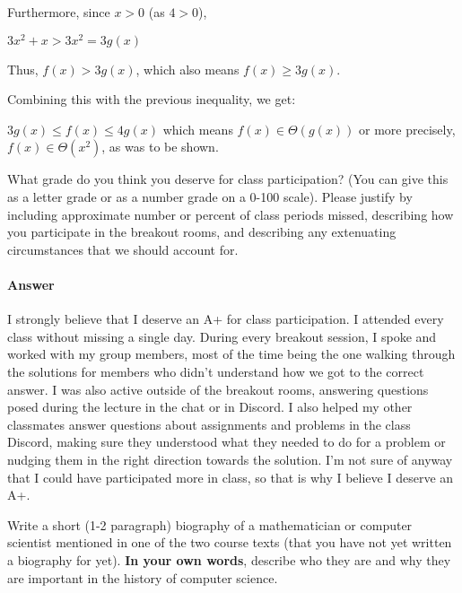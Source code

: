 \documentclass{article}
\begin{document}
Furthermore, since $x > 0$ (as $4 > 0$),

$3x^2+x > 3x^2 = 3g(x)$

Thus, $f(x) > 3g(x)$, which also means $f(x) \geq 3g(x)$.

Combining this with the previous inequality, we get:

$3g(x) \leq f(x) \leq 4g(x)$ which means $f(x) \in \Theta(g(x))$ or more precisely, $f(x) \in \Theta(x^2)$, as was to be shown.




 

What grade do you think you deserve for class participation? (You can give this
as a letter grade or as a number grade on a 0-100 scale). Please justify by
including approximate number or percent of class periods missed, describing how
you participate in the breakout rooms, and describing any extenuating
circumstances that we should account for.

\paragraph{Answer}

I strongly believe that I deserve an A+ for class participation. I attended every class without missing a single day. During every breakout session, I spoke and worked with my group members, most of the time being the one walking through the solutions for members who didn't understand how we got to the correct answer. I was also active outside of the breakout rooms, answering questions posed during the lecture in the chat or in Discord. I also helped my other classmates answer questions about assignments and problems in the class Discord, making sure they understood what they needed to do for a problem or nudging them in the right direction towards the solution. I'm not sure of anyway that I could have participated more in class, so that is why I believe I deserve an A+.



Write a short (1-2 paragraph) biography of a mathematician or computer scientist
mentioned in one of the two course texts (that you have not yet written a
biography for yet).
\textbf{In your own words}, describe who they are and why they are important in
the history of computer science.
\end{document}

